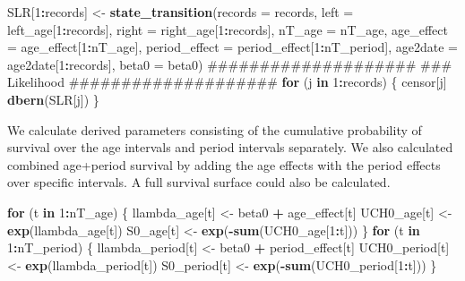 \documentclass[11pt,]{article}
\newenvironment{Shaded}{\begin{snugshade}}{\end{snugshade}}
\newcommand{\KeywordTok}[1]{\textcolor[rgb]{0.13,0.29,0.53}{\textbf{#1}}}
\newcommand{\DataTypeTok}[1]{\textcolor[rgb]{0.13,0.29,0.53}{#1}}
\newcommand{\DecValTok}[1]{\textcolor[rgb]{0.00,0.00,0.81}{#1}}
\newcommand{\StringTok}[1]{\textcolor[rgb]{0.31,0.60,0.02}{#1}}
\newcommand{\ControlFlowTok}[1]{\textcolor[rgb]{0.13,0.29,0.53}{\textbf{#1}}}
\newcommand{\OperatorTok}[1]{\textcolor[rgb]{0.81,0.36,0.00}{\textbf{#1}}}
\newcommand{\NormalTok}[1]{#1}
\begin{document}
\begin{Shaded}
\begin{Highlighting}[]
\NormalTok{  SLR[}\DecValTok{1}\OperatorTok{:}\NormalTok{records] <-}\StringTok{ }\KeywordTok{state_transition}\NormalTok{(}\DataTypeTok{records =}\NormalTok{ records,}
                                   \DataTypeTok{left =}\NormalTok{ left_age[}\DecValTok{1}\OperatorTok{:}\NormalTok{records],}
                                   \DataTypeTok{right =}\NormalTok{ right_age[}\DecValTok{1}\OperatorTok{:}\NormalTok{records],}
                                   \DataTypeTok{nT_age =}\NormalTok{ nT_age,}
                                   \DataTypeTok{age_effect =}\NormalTok{ age_effect[}\DecValTok{1}\OperatorTok{:}\NormalTok{nT_age],}
                                   \DataTypeTok{period_effect =}\NormalTok{ period_effect[}\DecValTok{1}\OperatorTok{:}\NormalTok{nT_period],}
                                   \DataTypeTok{age2date =}\NormalTok{ age2date[}\DecValTok{1}\OperatorTok{:}\NormalTok{records],}
                                   \DataTypeTok{beta0 =}\NormalTok{ beta0)}
\NormalTok{  ####################}
\NormalTok{  ### Likelihood}
\NormalTok{  ####################}
  \ControlFlowTok{for}\NormalTok{ (j }\ControlFlowTok{in} \DecValTok{1}\OperatorTok{:}\NormalTok{records) \{}
\NormalTok{    censor[j] }\OperatorTok{~}\StringTok{ }\KeywordTok{dbern}\NormalTok{(SLR[j])}
\NormalTok{  \}}
\end{Highlighting}
\end{Shaded}

We calculate derived parameters consisting of the cumulative probability
of survival over the age intervals and period intervals separately. We
also calculated combined age+period survival by adding the age effects
with the period effects over specific intervals. A full survival surface
could also be calculated.

\begin{Shaded}
\begin{Highlighting}[]
  \ControlFlowTok{for}\NormalTok{ (t }\ControlFlowTok{in} \DecValTok{1}\OperatorTok{:}\NormalTok{nT_age) \{}
\NormalTok{    llambda_age[t] <-}\StringTok{ }\NormalTok{beta0 }\OperatorTok{+}\StringTok{ }\NormalTok{age_effect[t]}
\NormalTok{    UCH0_age[t] <-}\StringTok{ }\KeywordTok{exp}\NormalTok{(llambda_age[t])}
\NormalTok{    S0_age[t] <-}\StringTok{ }\KeywordTok{exp}\NormalTok{(}\OperatorTok{-}\KeywordTok{sum}\NormalTok{(UCH0_age[}\DecValTok{1}\OperatorTok{:}\NormalTok{t]))}
\NormalTok{  \}}
  \ControlFlowTok{for}\NormalTok{ (t }\ControlFlowTok{in} \DecValTok{1}\OperatorTok{:}\NormalTok{nT_period) \{}
\NormalTok{    llambda_period[t] <-}\StringTok{ }\NormalTok{beta0 }\OperatorTok{+}\StringTok{ }\NormalTok{period_effect[t]}
\NormalTok{    UCH0_period[t] <-}\StringTok{ }\KeywordTok{exp}\NormalTok{(llambda_period[t])}
\NormalTok{    S0_period[t] <-}\StringTok{ }\KeywordTok{exp}\NormalTok{(}\OperatorTok{-}\KeywordTok{sum}\NormalTok{(UCH0_period[}\DecValTok{1}\OperatorTok{:}\NormalTok{t]))}
\NormalTok{  \}}
\end{Highlighting}
\end{Shaded}
\end{document}
